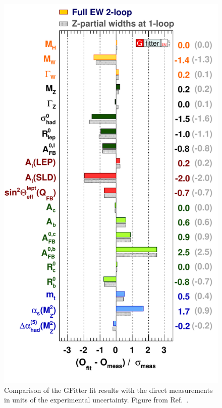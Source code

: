 \begin{figure}[p]
\centering
\includegraphics[height=0.8\textheight]
{figures/standardmodel/2014_07_16_PullPlotTwoBarsTwoTheos_logo}
\caption{ Comparison of the GFitter fit results with the direct measurements in units of the
experimental uncertainty. 
Figure from Ref.~\cite{Baak:2014ora}.
\label{fig:global_fit1}}
\end{figure}

